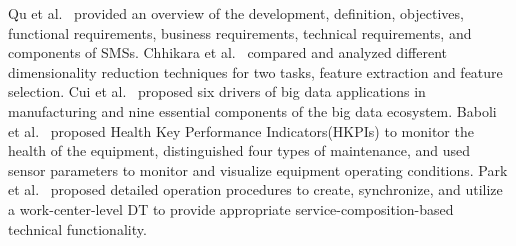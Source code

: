 \documentclass[a4paper,fleqn]{cas-dc}
\begin{document}
Qu et al.~\cite{Qu2019} provided an overview of the development, definition, objectives, functional requirements, business requirements, technical requirements, and components of SMSs.
Chhikara et al.~\cite{Chhikara2022} compared and analyzed different dimensionality reduction techniques for two tasks, feature extraction and feature selection.
Cui et al.~\cite{Cui2020} proposed six drivers of big data applications in manufacturing and nine essential components of the big data ecosystem.
Baboli et al.~\cite{Baboli2021} proposed Health Key Performance Indicators(HKPIs) to monitor the health of the equipment, distinguished four types of maintenance, and used sensor parameters to monitor and visualize equipment operating conditions.
Park et al.~\cite{Park2020} proposed detailed operation procedures to create, synchronize, and utilize a work-center-level DT to provide appropriate service-composition-based technical functionality.
\end{document}
